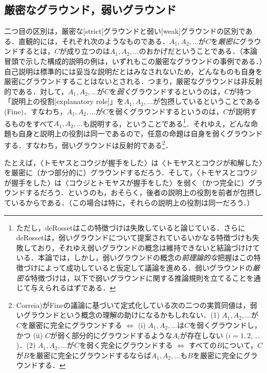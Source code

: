 \documentclass[twoside,14Q,uplatex,dvipdfmx]{jsarticle}
\theoremstyle{definition}
\begin{document}
\subsection{厳密なグラウンド，弱いグラウンド}
二つ目の区別は，厳密な[strict]グラウンドと弱い[weak]グラウンドの区別である．直観的には，それぞれ次のようなものである．$A_1, A_2, \ldots$が$C$を\emph{厳密に}グラウンドするとは，$C$が成り立つのは$A_1, A_2, \ldots$のおかげだということである．（本論冒頭で示した構成的説明の例は，いずれもこの厳密なグラウンドの事例である．）自己説明は標準的には妥当な説明だとはみなされないため，どんなものも自身を厳密にグラウンドすることはないとされる．つまり，厳密なグラウンドは非反射的である．対して，$A_1, A_2, \ldots$が$C$を\emph{弱く}グラウンドするというのは，$C$が持つ「説明上の役割[explanatory role]」を$A_1, A_2, \ldots$が包摂しているということである(Fine\cite[p.3]{Fine2012b})．すなわち，$A_1, A_2, \ldots$が$C$を弱くグラウンドするというのは，$C$が説明するものをすべて$A_1, A_2, \ldots$も説明する，ということである\footnote{ただし，deRosset\cite[pp.715--8]{deRosset2014}はこの特徴づけは失敗していると論じている．さらにdeRossetは，弱いグラウンドについて提案されているいかなる特徴づけも失敗しており，それゆえ弱いグラウンドの概念は維持できないと結論づけけている．本論では，しかし，弱いグラウンドの概念の\emph{前理論的な}把握はこの特徴づけによって成功していると仮定して議論を進める．弱いグラウンドの\emph{厳密な}特徴づけは，以下で弱いグラウンドに関する推論規則を立てることを通じて与えられるはずである．}．それゆえ，どんな命題も自身と説明上の役割は同一であるので，任意の命題は自身を弱くグラウンドする．すなわち，弱いグラウンドは反射的である\footnote{Correia\cite[p.510]{Correia2017})がFine\cite{Fine2012b}の議論に基づいて定式化している次の二つの実質同値は，弱いグラウンドという概念の理解の助けになるかもしれない．(1) $A_1, A_2, \ldots$が$C$を厳密に完全にグラウンドする $\Leftrightarrow$ (i) $A_1, A_2, \ldots$は$C$を弱くグラウンドし，かつ (ii) $C$が弱く部分的にグラウンドするような$A_i$が存在しない ($i=1, 2, \ldots$)．(2) $A_1, A_2, \ldots$が$C$を弱く完全にグラウンドする $\Leftrightarrow$ すべての$B$について，$C$が$B$を厳密に完全にグラウンドするならば$A_1, A_2, \ldots$も$B$を厳密に完全にグラウンドする．}．

たとえば，〈トモヤスとコウジが握手をした〉は〈トモヤスとコウジが和解した〉を厳密に（かつ部分的に）グラウンドするだろう．そして，〈トモヤスとコウジが握手をした〉は〈コウジとトモヤスが握手をした〉を弱く（かつ完全に）グラウンドするだろう．というのも，おそらく，後者の説明上の役割を前者が包摂しているからである．（この場合は特に，それらの説明上の役割は同一だろう．）
\end{document}
